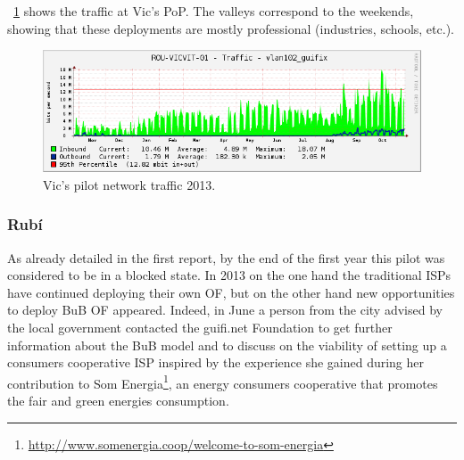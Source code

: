 
\figurename~\ref{fig:vic_2014_transit} shows the traffic at Vic's PoP. The valleys correspond to the weekends, showing that these deployments are mostly professional (industries, schools, etc.).

\begin{figure}[H]
  \centering
  \includegraphics[width=0.95\linewidth]{sect2/figures/vic_2014_transit.png}
  \caption[Vic pilot: Network traffic 2013]{Vic's pilot network traffic 2013.}
  \label{fig:vic_2014_transit}
\end{figure}


\FloatBarrier
\subsubsection{Rub\'{i}}
\label{dep_rubi}

As already detailed in the first report, by the end of the first year this pilot was considered to be in a blocked state. In 2013 on the one hand the traditional ISPs have continued deploying their own OF, but on the other hand new opportunities to deploy BuB OF appeared. Indeed, in June a person from the city advised by the local government contacted the guifi.net Foundation to get further information about the BuB model and to discuss on the viability of setting up a consumers cooperative ISP inspired by the experience she gained during her contribution to Som Energia\footnote{\url{http://www.somenergia.coop/welcome-to-som-energia}}, an energy consumers cooperative that promotes the fair and green energies consumption.

